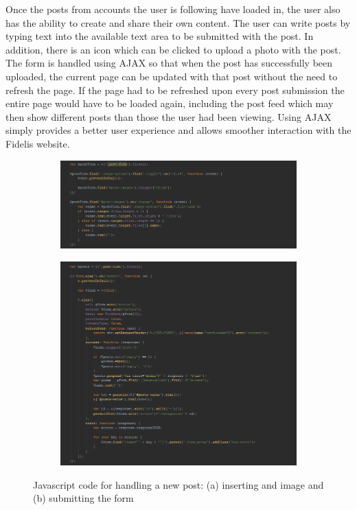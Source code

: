 Once the posts from accounts the user is following have loaded in, the user also has the ability to create and share their own content. The user can write posts by typing text into the available text area to be submitted with the post. In addition, there is an icon which can be clicked to upload a photo with the post. The form is handled using AJAX so that when the post has successfully been uploaded, the current page can be updated with that post without the need to refresh the page. If the page had to be refreshed upon every post submission the entire page would have to be loaded again, including the post feed which may then show different posts than those the user had been viewing. Using AJAX simply provides a better user experience and allows smoother interaction with the Fidelis website.

\begin{figure}[H]
\centering
\begin{subfigure}[b]{1\linewidth}
    \includegraphics[width=\textwidth]{Images/Implementation/HomeNewPostJS}
    \caption{}
    \label{fig:HomeNewPostJS}
\end{subfigure}
\begin{subfigure}[b]{1\linewidth}
    \includegraphics[width=\textwidth]{Images/Implementation/HomeNewPostJS2}
    \caption{}
    \label{fig:HomeNewPostJS2}
\end{subfigure}
\caption{Javascript code for handling a new post: (a) inserting and image and (b) submitting the form}
\label{fig:HomeNewPostJavascript}
\end{figure}


